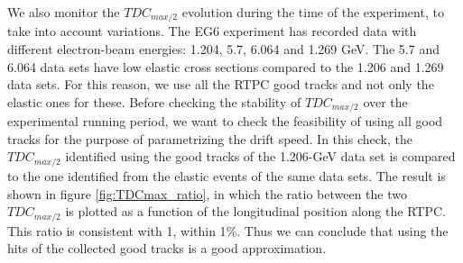 We also monitor the $TDC_{max/2}$ evolution during the time of the experiment, 
to take into account variations. The EG6 experiment has recorded data with 
different electron-beam energies: 1.204, 5.7, 6.064 and 1.269 GeV. The 5.7 and 
6.064 data sets have low elastic cross sections compared to the 1.206 and 1.269 
data sets. For this reason, we use all the RTPC good tracks and not only the 
elastic ones for these. Before checking the stability of $TDC_{max/2}$ over the 
experimental running period, we want to check the feasibility of using all good 
tracks for the purpose of parametrizing the drift speed. In this check, the 
$TDC_{max/2}$ identified using the good tracks of the 1.206-GeV data set is 
compared to the one identified from the elastic events of the same data sets.  
The result is shown in figure \ref{fig:TDCmax_ratio}, in which the ratio 
between the two $TDC_{max/2}$ is plotted as a function of the longitudinal 
position along the RTPC. This ratio is consistent with 1, within 1$\%$. Thus we 
can conclude that using the hits of the collected good tracks is a good 
approximation. 

